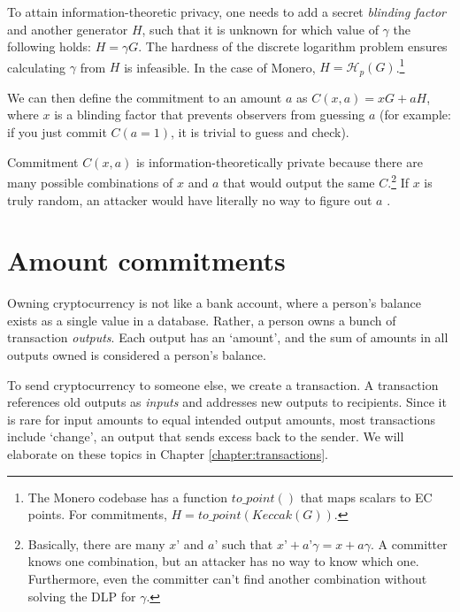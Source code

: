 To attain information-theoretic privacy, one needs to add a secret {\em blinding factor} and another generator \(H\), such that it is unknown for which value of \(\gamma\) the following holds: \(H = \gamma G\). The hardness of the discrete logarithm problem ensures calculating $\gamma$ from $H$ is infeasible. In the case of Monero, $H = \mathcal{H}_p(G)$.\footnote{\label{hashtopoint_note}The Monero codebase has a function $to\_point()$ that maps scalars to EC points. For commitments, $H = to\_point(\mathit{Keccak}(G))$.}%

We can then define the commitment to an amount \(a\) as \(C(x, a) = x G + a H\), where \(x\) is a blinding factor that prevents observers from guessing $a$ (for example: if you just commit $C(a=1)$, it is trivial to guess and check). 

Commitment $C(x, a)$ is information-theoretically private because there are many possible combinations of $x$ and $a$ that would output the same $C$.\footnote{Basically, there are many $x’$ and $a’$ such that $x’+a’ \gamma = x+a \gamma$. A committer knows one combination, but an attacker has no way to know which one. Furthermore, even the committer can't find another combination without solving the DLP for $\gamma$.} If $x$ is truly random, an attacker would have literally no way to figure out $a$ \cite{maxwell-ct} \cite{SCOZZAFAVA1993313}.%
\\




\section{Amount commitments}
\label{sec:pedersen_monero}

Owning cryptocurrency is not like a bank account, where a person’s balance exists as a single value in a database. Rather, a person owns a bunch of transaction {\em outputs}. Each output has an `amount’, and the sum of amounts in all outputs owned is considered a person’s balance.

To send cryptocurrency to someone else, we create a transaction. A transaction references old outputs as {\em inputs} and addresses new outputs to recipients. Since it is rare for input amounts to equal intended output amounts, most transactions include `change’, an output that sends excess back to the sender. We will elaborate on these topics in Chapter \ref{chapter:transactions}.

